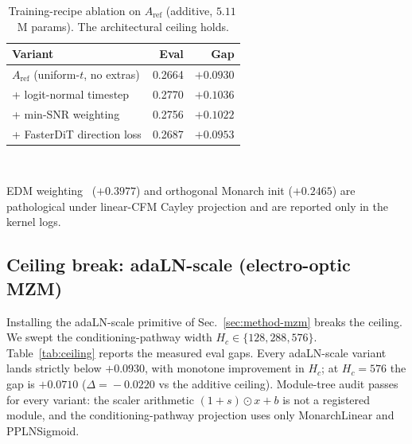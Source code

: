 \documentclass[conference]{IEEEtran}
\begin{document}
\begin{table}[tbp]
\caption{Training-recipe ablation on $A_\mathrm{ref}$ (additive,
$5.11$\,M params).  The architectural ceiling holds.}
\label{tab:ablation}
\centering\footnotesize
\setlength{\tabcolsep}{4pt}
\renewcommand{\arraystretch}{1.1}
\begin{tabular}{@{}lrr@{}}
\toprule
\textbf{Variant} & \textbf{Eval} & \textbf{Gap} \\
\midrule
$A_\mathrm{ref}$ (uniform-$t$, no extras)  & 0.2664 & $+0.0930$\\
+ logit-normal timestep \cite{esser2024}    & 0.2770 & $+0.1036$\\
+ min-SNR weighting \cite{hang2023minsnr}   & 0.2756 & $+0.1022$\\
+ FasterDiT direction loss \cite{fasterdit2024} & 0.2687 & $+0.0953$\\
\bottomrule
\end{tabular}\\[2pt]
{\raggedright\scriptsize EDM weighting~\cite{karras2022edm}
($+0.3977$) and orthogonal Monarch init
($+0.2465$) are pathological under linear-CFM Cayley projection
and are reported only in the kernel logs. \par}
\end{table}

\subsection{Ceiling break: adaLN-scale (electro-optic MZM)}
\label{sec:exp-ceiling}

Installing the adaLN-scale primitive of Sec.~\ref{sec:method-mzm}
breaks the ceiling.  We swept the conditioning-pathway width
$H_c\!\in\!\{128,288,576\}$.  Table~\ref{tab:ceiling} reports the
measured eval gaps.  Every adaLN-scale variant lands strictly
below $+0.0930$, with monotone improvement in $H_c$; at
$H_c{=}576$ the gap is $+0.0710$ ($\Delta\!=\!-0.0220$ vs the
additive ceiling).  Module-tree audit passes for every variant:
the scaler arithmetic $(1{+}s)\!\odot\!x{+}b$ is not a registered
module, and the conditioning-pathway projection uses only
MonarchLinear and PPLNSigmoid.
\end{document}
